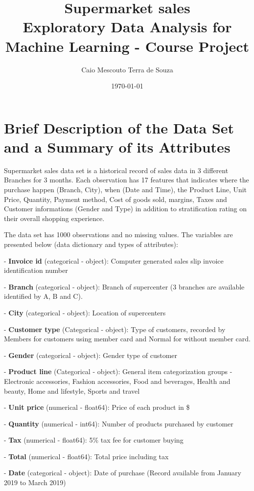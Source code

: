 \documentclass[11pt, a4]{article}
\title{Supermarket sales \\
		\large Exploratory Data Analysis for Machine Learning - Course Project}
\author{Caio Mescouto Terra de Souza}
\date{\today}
\begin{document}
\maketitle

\section*{Brief Description of the Data Set and a Summary of its Attributes}

Supermarket sales data set \cite{sales} is a historical record of sales data in 3 different Branches for 3 months. Each observation has 17 features that indicates where the purchase happen (Branch, City), when (Date and Time), the Product Line, Unit Price, Quantity, Payment method, Cost of goods sold, margins, Taxes and Customer informations (Gender and Type) in addition to stratification rating on their overall shopping experience.

The data set has 1000 observations and no missing values. The variables are presented below (data dictionary and types of attributes):

- \textbf{Invoice id} (categorical - object): Computer generated sales slip invoice identification number

- \textbf{Branch} (categorical - object): Branch of supercenter (3 branches are available identified by A, B and C).

- \textbf{City} (categorical - object): Location of supercenters

- \textbf{Customer type} (Categorical - object): Type of customers, recorded by Members for customers using member card and Normal for without member card.

- \textbf{Gender} (categorical - object): Gender type of customer

- \textbf{Product line} (Categorical - object): General item categorization groups - Electronic accessories, Fashion accessories, Food and beverages, Health and beauty, Home and lifestyle, Sports and travel

- \textbf{Unit price} (numerical - float64): Price of each product in \$

- \textbf{Quantity} (numerical - int64): Number of products purchased by customer

- \textbf{Tax} (numerical - float64): 5\% tax fee for customer buying

- \textbf{Total} (numerical - float64): Total price including tax

- \textbf{Date} (categorical - object): Date of purchase (Record available from January 2019 to March 2019)
\end{document}
